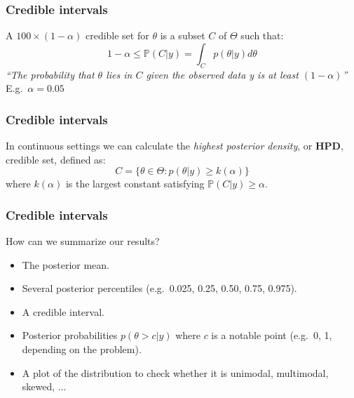 \documentclass{beamer}
\renewcommand{\P}{\mathbb{P}}
\newcommand{\1}{\ensuremath{\mathbf{1}}}
\begin{document}
%
%
%
\begin{frame}\frametitle{Credible intervals}
	A $100\times(1-\alpha)$ credible set for $\theta$ is a subset $C$ of $\Theta$ such that:
	\begin{equation}
		1 - \alpha \leq \P(C|y) = \int_C p(\theta|y) d\theta
	\end{equation}
	\emph{``The probability that $\theta$ lies in $C$ given the observed data y is at least $(1 - \alpha)$''}\\[1.5ex]
	E.g.\ $\alpha = 0.05$
\end{frame}
%
%
%
\begin{frame}\frametitle{Credible intervals}
	In continuous settings we can calculate the \emph{highest posterior density}, or \textbf{HPD}, credible set, defined as:
	\begin{equation}
		C = \{\theta \in \Theta : p(\theta|y) \geq k(\alpha)\}
	\end{equation}
	where $k(\alpha)$ is the largest constant satisfying $\P(C|y) \geq \alpha$.\\[2ex]
\end{frame}
%
%
%
\begin{frame}\frametitle{Credible intervals}
	How can we summarize our results?
	\begin{itemize}
		\item The posterior mean.
		\item Several posterior percentiles (e.g.\ 0.025, 0.25, 0.50, 0.75, 0.975).
		\item A credible interval.
		\item Posterior probabilities $p(\theta > c|y)$ where $c$ is a notable point (e.g.\ 0, 1, depending on the problem).
		\item A plot of the distribution to check whether it is unimodal, multimodal, skewed, ...
	\end{itemize}
\end{frame}
\end{document}
